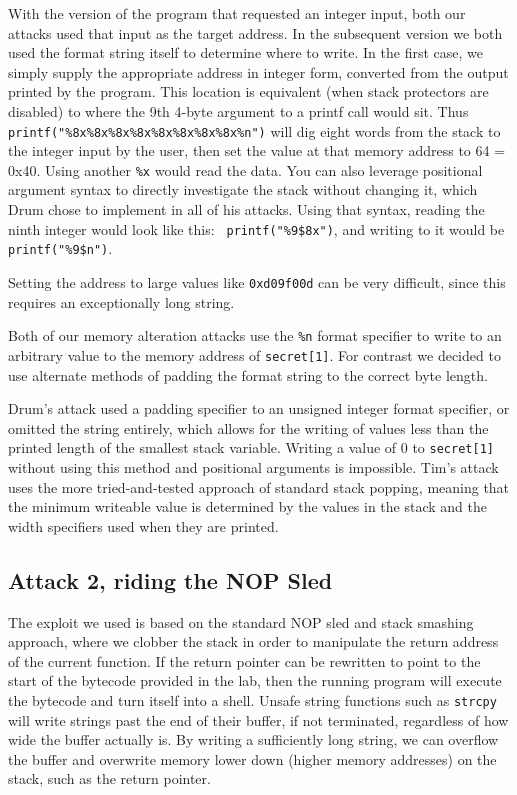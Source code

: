 With the version of the program that requested an integer input, both our attacks used that input as the target address.
In the subsequent version we both used the format string itself to determine where to write. In the first case, we simply supply the appropriate address in integer form, converted from the output printed by the program. This location is equivalent (when stack protectors are disabled) to where the 9th 4-byte argument to a printf call would sit. Thus {\tt printf("\%8x\%8x\%8x\%8x\%8x\%8x\%8x\%8x\%n")} will dig eight words from the stack to
the integer input by the user, then set the value at that memory address to 64 = 0x40. Using another {\tt\%x} would read
the data. You can also leverage positional argument syntax to directly investigate the stack without changing it, which
Drum chose to implement in all of his attacks. Using that syntax, reading the ninth integer would look like this: {\tt
printf("\%9\$8x")}, and writing to it would be {\tt printf("\%9\$n")}.

Setting the address to large values like {\tt 0xd09f00d} can be very difficult, since this requires an
exceptionally long string.

Both of our memory alteration attacks use the {\tt \%n} format specifier to write to an arbitrary value to the memory
address of {\tt secret[1]}. For contrast we decided to use alternate methods of padding the format string to the correct
byte length.

Drum's attack used a padding specifier to an unsigned integer format specifier, or omitted the string entirely, which
allows for the writing of values less than the printed length of the smallest stack variable. Writing a value of 0 to
{\tt secret[1]} without using this method and positional arguments is impossible. Tim's attack uses the more
tried-and-tested approach of standard stack popping, meaning that the minimum writeable value is determined by the
values in the stack and the width specifiers used when they are printed.

\subsection{Attack 2, riding the NOP Sled}

The exploit we used is based on the standard NOP sled and stack smashing approach, where we clobber the stack in order
to manipulate the return address of the current function. If the return pointer can be rewritten to point to the start
of the bytecode provided in the lab, then the running program will execute the bytecode and turn itself into a shell.
Unsafe string functions such as {\tt strcpy} will write strings past the end of their buffer, if not terminated,
regardless of how wide the buffer actually is. By writing a sufficiently long string, we can overflow the buffer and
overwrite memory lower down (higher memory addresses) on the stack, such as the return pointer.


